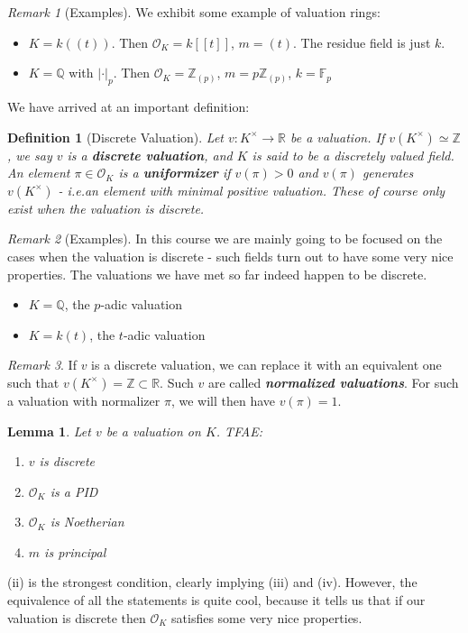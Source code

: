 \documentclass[]{article}
\theoremstyle{custhm}
\theoremstyle{cusdef}
\newtheorem{defin}[theorem]{Definition}
\theoremstyle{custhm}
\newtheorem{lemma}[theorem]{Lemma}
\theoremstyle{custhm}
\theoremstyle{custhm}
\theoremstyle{custhm}
\theoremstyle{cusdef}
\theoremstyle{remark}
\newtheorem*{remark*}{Remark}
\newcommand{\Z}{\mathbb{Z}}
\newcommand{\Q}{\mathbb{Q}}
\newcommand{\R}{\mathbb{R}}
\newcommand{\ra}{\rightarrow}
\newcommand{\ie}{\textit{i.e.}}
\newcommand{\undf}[1]{\textit{\textbf{#1}}}
\renewcommand{\O}{\mathcal{O}}
\begin{document}
\begin{remark*}[Examples]
We exhibit some example of valuation rings:
\begin{itemize}
	\item $K = k((t))$. Then $\O_K = k[[t]]$, $m = (t)$. The residue field is just $k$.
	\item $K = \Q$ with $|\cdot|_p$. Then $\O_K = \Z_{(p)}$, $m = p\Z_{(p)}$, $k = \mathbb{F}_p$
\end{itemize}
\end{remark*}

We have arrived at an important definition:

\begin{defin}[Discrete Valuation]
Let $v:K^\times \ra\R$ be a valuation. If $v(K^\times)\simeq \Z$, we say $v$ is a \undf{discrete valuation}, and $K$ is said to be a discretely valued field. An element $\pi \in \O_K$ is a \undf{uniformizer} if $v(\pi) > 0$ and $v(\pi)$ generates $v(K^\times)$ - \ie an element with minimal positive valuation. These of course only exist when the valuation is discrete.
\end{defin}
\begin{remark*}[Examples]
In this course we are mainly going to be focused on the cases when the valuation is discrete - such fields turn out to have some very nice properties. The valuations we have met so far indeed happen to be discrete.
\begin{itemize}
	\item $K = \Q$, the $p$-adic valuation
	\item $K = k(t)$, the $t$-adic valuation
\end{itemize}
\end{remark*}
\begin{remark*}
	If $v$ is a discrete valuation, we can replace it with an equivalent one such that $v(K^\times) = \Z\subset \R$. Such $v$ are called \undf{normalized valuations}. For such a valuation with normalizer $\pi$, we will then have $v(\pi) = 1$.
\end{remark*}

\begin{lemma}
	Let $v$ be a valuation on $K$. TFAE:
	\begin{enumerate}[label = (\roman*)]
		\item $v$ is discrete
		\item $\O_K$ is a PID
		\item $\O_K$ is Noetherian
		\item $m$ is principal
	\end{enumerate}
\end{lemma}
(ii) is the strongest condition, clearly implying (iii) and (iv). However, the equivalence of all the statements is quite cool, because it tells us that if our valuation is discrete then $\O_K$ satisfies some very nice properties.
\end{document}

